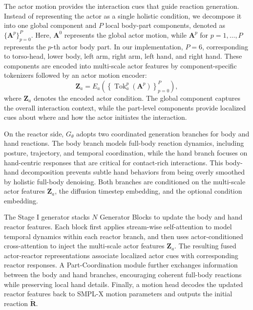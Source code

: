 \documentclass{article}
\begin{document}
The actor motion provides the interaction cues that guide reaction generation. Instead of representing the actor as a single holistic condition, we decompose it into one global component and $P$ local body-part components, denoted as $\{\mathbf{A}^{p}\}_{p=0}^{P}$. Here, $\mathbf{A}^{0}$ represents the global actor motion, while $\mathbf{A}^{p}$ for $p=1,\ldots,P$ represents the $p$-th actor body part. In our implementation, $P=6$, corresponding to torso-head, lower body, left arm, right arm, left hand, and right hand. These components are encoded into multi-scale actor features by component-specific tokenizers followed by an actor motion encoder:
\begin{equation}
\mathbf{Z}_{a}
=
E_a
\left(
\left\{
\operatorname{Tok}_{a}^{p}(\mathbf{A}^{p})
\right\}_{p=0}^{P}
\right),
\end{equation}
where $\mathbf{Z}_{a}$ denotes the encoded actor condition. The global component captures the overall interaction context, while the part-level components provide localized cues about where and how the actor initiates the interaction.

On the reactor side, $G_{\theta}$ adopts two coordinated generation branches for body and hand reactions. The body branch models full-body reaction dynamics, including posture, trajectory, and temporal coordination, while the hand branch focuses on hand-centric responses that are critical for contact-rich interactions. This body-hand decomposition prevents subtle hand behaviors from being overly smoothed by holistic full-body denoising. Both branches are conditioned on the multi-scale actor features $\mathbf{Z}_{a}$, the diffusion timestep embedding, and the optional condition embedding.

The Stage I generator stacks $N$ Generator Blocks to update the body and hand reactor features. Each block first applies stream-wise self-attention to model temporal dynamics within each reactor branch, and then uses actor-conditioned cross-attention to inject the multi-scale actor features $\mathbf{Z}_{a}$. The resulting fused actor-reactor representations associate localized actor cues with corresponding reactor responses. A Part-Coordination module further exchanges information between the body and hand branches, encouraging coherent full-body reactions while preserving local hand details. Finally, a motion head decodes the updated reactor features back to SMPL-X motion parameters and outputs the initial reaction $\widetilde{\mathbf{R}}$.
\end{document}
